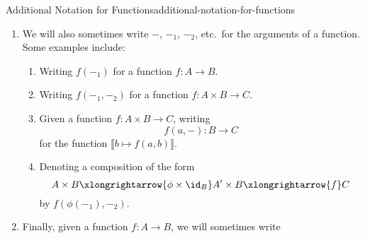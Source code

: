 \begin{notation}{Additional Notation for Functions}{additional-notation-for-functions}
\begin{enumerate}
\begin{enumerate}
\begin{enumerate}
                        \item\label{additional-notation-for-functions-2-c-iii}$(\lambda[x].\ f([x]))$%
                    \end{enumerate}
                \item\label{additional-notation-for-functions-2-d}Function evaluations, cf.:
                    \begin{enumerate}
                        \item\label{additional-notation-for-functions-2-d-i}$\Phi(\llbracket x\mapsto f(x)\rrbracket)$%
                        \item\label{additional-notation-for-functions-2-d-ii}$\Phi((x\mapsto f(x)))$%
                        \item\label{additional-notation-for-functions-2-d-iii}$\Phi((\lambda x.\ f(x)))$%
                    \end{enumerate}
            \end{enumerate}
        \item\label{additional-notation-for-functions-3}We will also sometimes write $-$, $-_{1}$, $-_{2}$, etc.\ for the arguments of a function. Some examples include:
            \begin{enumerate}
                \item\label{additional-notation-for-functions-3-a}Writing $f(-_{1})$ for a function $f\colon A\to B$.
                \item\label{additional-notation-for-functions-3-b}Writing $f(-_{1},-_{2})$ for a function $f\colon A\times B\to C$.
                \item\label{additional-notation-for-functions-3-c}Given a function $f\colon A\times B\to C$, writing
                    \[
                        f(a,-)%
                        \colon%
                        B%
                        \to%
                        C%
                    \]%
                    for the function $\llbracket b\mapsto f(a,b)\rrbracket$.
                \item\label{additional-notation-for-functions-3-d}Denoting a composition of the form%
                    \[
                        A\times B%
                        \xlongrightarrow{\phi\times\id_{B}}%
                        A'\times B%
                        \xlongrightarrow{f}%
                        C%
                    \]%
                    by $f(\phi(-_{1}),-_{2})$.
            \end{enumerate}
        \item\label{additional-notation-for-functions-4}Finally, given a function $f\colon A\to B$, we will sometimes write

\end{enumerate}
\end{notation}
